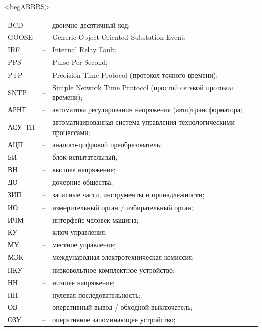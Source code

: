 \color{uniblue}\section*{}
{\color{white}\fontsize{0.1pt}{0.1pt}\selectfont<begABBRS>}
\color{black}
\begin{longtable}{>{\raggedright\arraybackslash}m{2cm}>{\raggedright\arraybackslash}m{0.5cm}>{\raggedright\arraybackslash}m{20cm}}
\endfirsthead\endhead\endfoot\endlastfoot
BCD & -- & двоично-десятичный код; \\
GOOSE & -- & Generic Object-Oriented Substation Event; \\
IRF & -- & Internal Relay Fault; \\
PPS & -- & Pulse Per Second; \\
PTP & -- & Precision Time Protocol (протокол точного времени); \\
SNTP & -- & Simple Network Time Protocol (простой сетевой протокол времени); \\
АРНТ & -- & автоматика регулирования напряжения (авто)трансформатора; \\
АСУ~ТП & -- & автоматизированная система управления технологическими процессами; \\
АЦП & -- & аналого-цифровой преобразователь; \\
БИ & -- & блок испытательный; \\
ВН & -- & высшее напряжение; \\
ДО & -- & дочерние общества; \\
ЗИП & -- & запасные части, инструменты и принадлежности; \\
ИО & -- & измерительный орган / избирательный орган; \\
ИЧМ & -- & интерфейс человек-машина; \\
КУ & -- & ключ управления; \\
МУ & -- & местное управление; \\
МЭК & -- & международная электротехническая комиссия; \\
НКУ & -- & низковольтное комплектное устройство; \\
НН & -- & низшее напряжение; \\
НП & -- & нулевая последовательность; \\
ОВ & -- & оперативный вывод / обходной выключатель; \\
ОЗУ & -- & оперативное запоминающее устройство; \\

\end{longtable}
